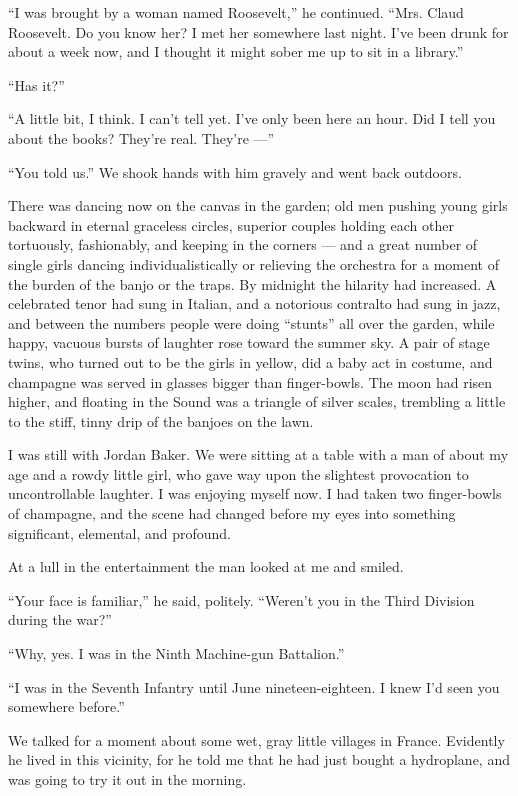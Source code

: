 \documentclass{znotebook}
\begin{document}
``I was brought by a woman named Roosevelt,'' he continued. ``Mrs. Claud Roosevelt. Do you know her? I met her somewhere last night. I've been drunk for about a week now, and I thought it might sober me up to sit in a library.''

``Has it?''

``A little bit, I think. I can't tell yet. I've only been here an hour. Did I tell you about the books? They're real. They're ---''

``You told us.'' We shook hands with him gravely and went back outdoors.

There was dancing now on the canvas in the garden; old men pushing young girls backward in eternal graceless circles, superior couples holding each other tortuously, fashionably, and keeping in the corners ---{} and a great number of single girls dancing individualistically or relieving the orchestra for a moment of the burden of the banjo or the traps. By midnight the hilarity had increased. A celebrated tenor had sung in Italian, and a notorious contralto had sung in jazz, and between the numbers people were doing ``stunts'' all over the garden, while happy, vacuous bursts of laughter rose toward the summer sky. A pair of stage twins, who turned out to be the girls in yellow, did a baby act in costume, and champagne was served in glasses bigger than finger-bowls. The moon had risen higher, and floating in the Sound was a triangle of silver scales, trembling a little to the stiff, tinny drip of the banjoes on the lawn.

I was still with Jordan Baker. We were sitting at a table with a man of about my age and a rowdy little girl, who gave way upon the slightest provocation to uncontrollable laughter. I was enjoying myself now. I had taken two finger-bowls of champagne, and the scene had changed before my eyes into something significant, elemental, and profound.

At a lull in the entertainment the man looked at me and smiled.

``Your face is familiar,'' he said, politely. ``Weren't you in the Third Division during the war?''

``Why, yes. I was in the Ninth Machine-gun Battalion.''

``I was in the Seventh Infantry until June nineteen-eighteen. I knew I'd seen you somewhere before.''

We talked for a moment about some wet, gray little villages in France. Evidently he lived in this vicinity, for he told me that he had just bought a hydroplane, and was going to try it out in the morning.
\end{document}
